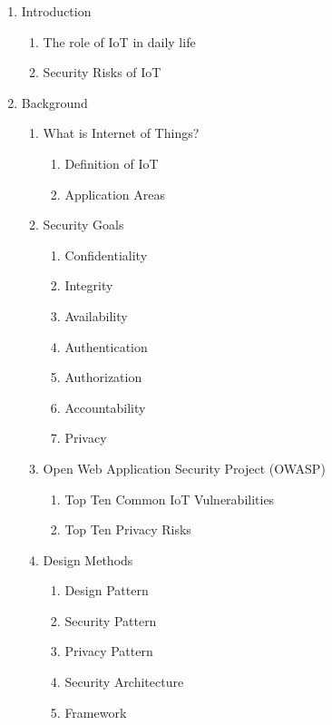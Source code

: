 \documentclass[
    numbers=noenddot,
    parskip=half-,
    fontsize=12pt,
    paper=a4,
    oneside,
    titlepage,
    bibliography=totoc,
    chapterprefix=false,
]{scrbook}
\begin{document}
	\begin{enumerate}
		\item Introduction
			\begin{enumerate}
				\item The role of IoT in daily life
				\item Security Risks of IoT
			\end{enumerate}
		
		\item Background
			\begin{enumerate}
				\item What is Internet of Things?
				 	\begin{enumerate}
				 		\item Definition of IoT
				 		\item Application Areas
				 	\end{enumerate}
				\item Security Goals
					\begin{enumerate}
						\item Confidentiality
						\item Integrity
						\item Availability
						\item Authentication
						\item Authorization
						\item Accountability
						\item Privacy
					\end{enumerate}
				\item Open Web Application Security Project (OWASP)
					\begin{enumerate}
						\item Top Ten Common IoT Vulnerabilities
						\item Top Ten Privacy Risks
					\end{enumerate}
				\item Design Methods
					\begin{enumerate}
						\item Design Pattern
						\item Security Pattern
						\item Privacy Pattern
						\item Security Architecture
						\item Framework
					\end{enumerate}
			\end{enumerate}
		

\end{enumerate}
\end{document}
